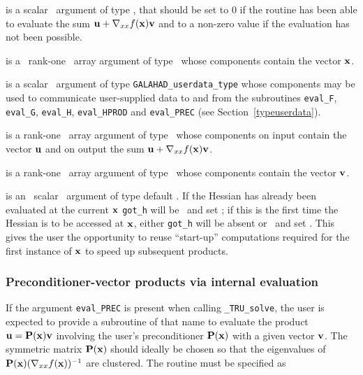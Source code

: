 \documentclass{galahad}
\newcommand{\packagename}{TRU}
\newcommand{\fullpackagename}{\libraryname\_\packagename}
\newcommand{\solver}{{\tt \fullpackagename\_solve}}
\begin{document}
\begin{description}
 is a scalar \intentout\ argument of type \integer,
that should be set to 0 if the routine has been able to evaluate the
sum ${\mathbf{u}} + \nabla_{xx} f({\mathbf{x}}) {\mathbf{v}}$
and to a non-zero value if the evaluation has not been possible.

 is a \ rank-one \intentin\ array argument of type
\realdp\ whose components contain the vector ${\mathbf{x}}$.

 is a scalar \intentinout\ argument of type
{\tt GALAHAD\_userdata\_type} whose components may be used
to communicate user-supplied data to and from the
subroutines {\tt eval\_F}, {\tt eval\_G},
{\tt eval\_H}, {\tt eval\_HPROD} and {\tt eval\_PREC}
(see Section~\ref{typeuserdata}).

 is a rank-one \intentinout\ array argument of type \realdp\
whose components on input contain the vector ${\mathbf{u}}$ and on output the
sum ${\mathbf{u}} + \nabla_{xx} f({\mathbf{x}}) {\mathbf{v}}$.

 is a rank-one \intentin\ array argument of type \realdp\
whose components contain the vector ${\mathbf{v}}$.

 is an \optional\ scalar \intentin\ argument of type default
\logical. If the Hessian has already been evaluated at the current ${\mathbf{x}}$
{\tt got\_h} will be \present\ and set \true; if this is the first time
the Hessian is to be accessed at ${\mathbf{x}}$, either {\tt got\_h} will be absent
or \present\ and set \false. This gives the user the opportunity
to reuse ``start-up'' computations required for the first instance of
${\mathbf{x}}$ to speed up subsequent products.

\end{description}


\subsubsection{Preconditioner-vector products via internal evaluation\label{pv}}

If the argument {\tt eval\_PREC} is present when calling \solver, the
user is expected to provide a subroutine of that name to evaluate the
product ${\mathbf{u}} = {\mathbf{P}}({\mathbf{x}}) {\mathbf{v}}$ involving the user's preconditioner
${\mathbf{P}}({\mathbf{x}})$ with a given vector ${\mathbf{v}}$. The symmetric matrix ${\mathbf{P}}({\mathbf{x}})$
should ideally be chosen so that the eigenvalues of
${\mathbf{P}}({\mathbf{x}}) (\nabla_{xx} f({\mathbf{x}}))^{-1}$ are clustered.
The routine must be specified as
\end{document}
